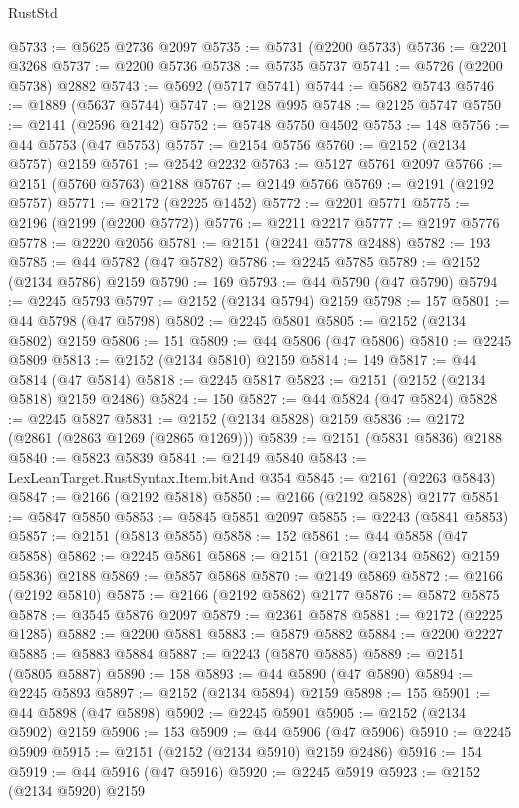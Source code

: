 \begin{lexlean}{RustStd}
\begin{coremodule}
@5733 := @5625 @2736 @2097
@5735 := @5731 (@2200 @5733)
@5736 := @2201 @3268
@5737 := @2200 @5736
@5738 := @5735 @5737
@5741 := @5726 (@2200 @5738) @2882
@5743 := @5692 (@5717 @5741)
@5744 := @5682 @5743
@5746 := @1889 (@5637 @5744)
@5747 := @2128 @995
@5748 := @2125 @5747
@5750 := @2141 (@2596 @2142)
@5752 := @5748 @5750 @4502
@5753 := 148
@5756 := @44 @5753 (@47 @5753)
@5757 := @2154 @5756
@5760 := @2152 (@2134 @5757) @2159
@5761 := @2542 @2232
@5763 := @5127 @5761 @2097
@5766 := @2151 (@5760 @5763) @2188
@5767 := @2149 @5766
@5769 := @2191 (@2192 @5757)
@5771 := @2172 (@2225 @1452)
@5772 := @2201 @5771
@5775 := @2196 (@2199 (@2200 @5772))
@5776 := @2211 @2217
@5777 := @2197 @5776
@5778 := @2220 @2056
@5781 := @2151 (@2241 @5778 @2488)
@5782 := 193
@5785 := @44 @5782 (@47 @5782)
@5786 := @2245 @5785
@5789 := @2152 (@2134 @5786) @2159
@5790 := 169
@5793 := @44 @5790 (@47 @5790)
@5794 := @2245 @5793
@5797 := @2152 (@2134 @5794) @2159
@5798 := 157
@5801 := @44 @5798 (@47 @5798)
@5802 := @2245 @5801
@5805 := @2152 (@2134 @5802) @2159
@5806 := 151
@5809 := @44 @5806 (@47 @5806)
@5810 := @2245 @5809
@5813 := @2152 (@2134 @5810) @2159
@5814 := 149
@5817 := @44 @5814 (@47 @5814)
@5818 := @2245 @5817
@5823 := @2151 (@2152 (@2134 @5818) @2159 @2486)
@5824 := 150
@5827 := @44 @5824 (@47 @5824)
@5828 := @2245 @5827
@5831 := @2152 (@2134 @5828) @2159
@5836 := @2172 (@2861 (@2863 @1269 (@2865 @1269)))
@5839 := @2151 (@5831 @5836) @2188
@5840 := @5823 @5839
@5841 := @2149 @5840
@5843 := LexLeanTarget.RustSyntax.Item.bitAnd @354
@5845 := @2161 (@2263 @5843)
@5847 := @2166 (@2192 @5818)
@5850 := @2166 (@2192 @5828) @2177
@5851 := @5847 @5850
@5853 := @5845 @5851 @2097
@5855 := @2243 (@5841 @5853)
@5857 := @2151 (@5813 @5855)
@5858 := 152
@5861 := @44 @5858 (@47 @5858)
@5862 := @2245 @5861
@5868 := @2151 (@2152 (@2134 @5862) @2159 @5836) @2188
@5869 := @5857 @5868
@5870 := @2149 @5869
@5872 := @2166 (@2192 @5810)
@5875 := @2166 (@2192 @5862) @2177
@5876 := @5872 @5875
@5878 := @3545 @5876 @2097
@5879 := @2361 @5878
@5881 := @2172 (@2225 @1285)
@5882 := @2200 @5881
@5883 := @5879 @5882
@5884 := @2200 @2227
@5885 := @5883 @5884
@5887 := @2243 (@5870 @5885)
@5889 := @2151 (@5805 @5887)
@5890 := 158
@5893 := @44 @5890 (@47 @5890)
@5894 := @2245 @5893
@5897 := @2152 (@2134 @5894) @2159
@5898 := 155
@5901 := @44 @5898 (@47 @5898)
@5902 := @2245 @5901
@5905 := @2152 (@2134 @5902) @2159
@5906 := 153
@5909 := @44 @5906 (@47 @5906)
@5910 := @2245 @5909
@5915 := @2151 (@2152 (@2134 @5910) @2159 @2486)
@5916 := 154
@5919 := @44 @5916 (@47 @5916)
@5920 := @2245 @5919
@5923 := @2152 (@2134 @5920) @2159

\end{coremodule}
\end{lexlean}
